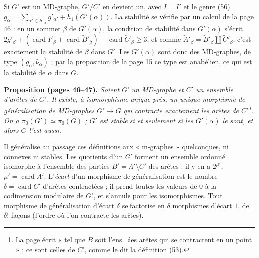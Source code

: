 \documentclass[11pt,a4paper]{article}
\begin{document}
Si $G'$ est un MD-graphe, $G'/C'$ en devient un, avec $I = I'$ et le genre (56)
$g_\alpha = \sum_{\alpha' \in S'_\alpha} g'_{\alpha'} + h_1(G'(\alpha))$. La
stabilité se vérifie par un calcul de la page 46 : en un sommet $\beta$ de
$G'(\alpha)$, la condition de stabilité dans $G'(\alpha)$ s'écrit $2g'_\beta +
(\operatorname{card} I'_\beta + \operatorname{card} \widetilde{B}'_\beta) +
\operatorname{card} \widetilde{C}'_\beta \geq 3$, et comme $\widetilde{A}'_\beta
= \widetilde{B}'_\beta \amalg \widetilde{C}'_\beta$, c'est exactement la
stabilité de $\beta$ dans $G'$. Les $G'(\alpha)$ sont donc des MD-graphes, de type
$(g_\alpha, \widehat{\nu}_\alpha)$ ; par la proposition de la page 15 ce type est
anabélien, ce qui est la stabilité de $\alpha$ dans $G$.

\textbf{Proposition (pages 46--47).} \emph{Soient $G'$ un MD-graphe et $C'$ un
ensemble d'arêtes de $G'$. Il existe, à isomorphisme unique près, un unique
morphisme de généralisation de MD-graphes $G' \to G$ qui contracte exactement les
arêtes de $C'$\footnote{La page écrit « tel que $B$ soit l'ens.\ des arêtes qui
se contractent en un point » ; ce sont celles de $C'$, comme le dit la
définition (53).}. On a $\pi_0(G') \simeq \pi_0(G)$ ; $G'$ est stable si et
seulement si les $G'(\alpha)$ le sont, et alors $G$ l'est aussi.}

Il généralise au passage ces définitions aux « m-graphes » quelconques, ni
connexes ni stables. Les quotients d'un $G'$ forment un ensemble ordonné
isomorphe à l'ensemble des parties $B' = A' \setminus C'$ des arêtes : il y en a
$2^{\mu'}$, $\mu' = \operatorname{card} A'$. L'\emph{écart} d'un morphisme de
généralisation est le nombre $\delta = \operatorname{card} C'$ d'arêtes
contractées ; il prend toutes les valeurs de $0$ à la codimension modulaire de
$G'$, et s'annule pour les isomorphismes. Tout morphisme de généralisation
d'écart $\delta$ se factorise en $\delta$ morphismes d'écart $1$, de $\delta!$
façons (l'ordre où l'on contracte les arêtes).
\end{document}
